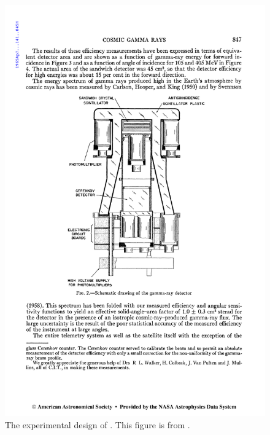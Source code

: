 \begin{figure}[htbp]
\centering
\includegraphics{chapters/introduction/figures/explorer_xi_instrument.pdf}
\caption{
The experimental design of \explorerxi.
This figure is from \cite{kraushaar_1965_explorer-experiment}. }
\end{figure}



